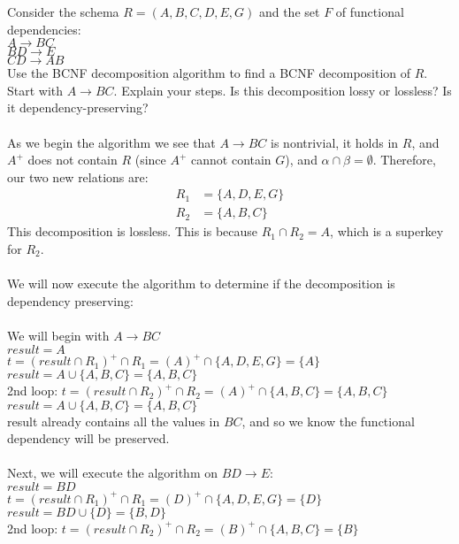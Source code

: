 \documentclass[a4 paper]{article}
\begin{document}
Consider the schema $R = (A, B, C, D, E, G)$ and the set $F$ of functional dependencies:\\
$A \rightarrow BC$\\
$BD \rightarrow E$\\
$CD \rightarrow AB$\\
Use the BCNF decomposition algorithm to find a BCNF decomposition of $R$. Start with $A \rightarrow BC$. Explain your steps. Is this decomposition lossy or lossless? Is it dependency-preserving?\\\\
As we begin the algorithm we see that $A\rightarrow BC$ is nontrivial, it holds in $R$, and $A^+$ does not contain $R$ (since $A^+$ cannot contain $G$), and $\alpha\cap\beta=\emptyset$.
Therefore, our two new relations are:
\begin{align*}
  R_1 &= \{A,D,E,G\}\\
  R_2 &= \{A,B,C\}
\end{align*}
This decomposition is lossless. This is because $R_1\cap R_2=A$, which is a superkey for $R_2$.\\\\
We will now execute the algorithm to determine if the decomposition is dependency preserving:\\\\
We will begin with $A\rightarrow BC$\\
$result = A$\\
$t=(result\cap R_1)^+\cap R_1=(A)^+\cap\{A,D,E,G\}=\{A\}$\\
$result=A\cup\{A,B,C\}=\{A,B,C\}$\\
2nd loop:
$t=(result\cap R_2)^+\cap R_2=(A)^+\cap\{A,B,C\}=\{A,B,C\}$\\
$result=A\cup\{A,B,C\}=\{A,B,C\}$\\
result already contains all the values in $BC$, and so we know the functional dependency will be preserved.\\\\
Next, we will execute the algorithm on $BD\rightarrow E$:\\
$result = BD$\\
$t=(result\cap R_1)^+\cap R_1=(D)^+\cap\{A,D,E,G\}=\{D\}$\\
$result=BD\cup\{D\}=\{B,D\}$\\
2nd loop:
$t=(result\cap R_2)^+\cap R_2=(B)^+\cap\{A,B,C\}=\{B\}$\\
\end{document}
